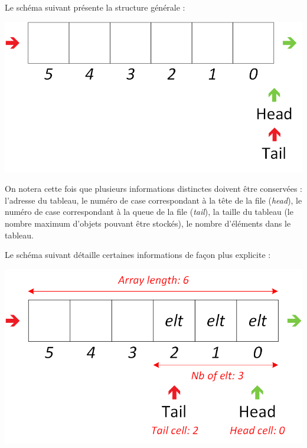 Le schéma suivant présente la structure générale :\\

\begin{center}
\includegraphics[scale=1]{Cours/Files_5_Tableau_Statique_Structure.png}
\end{center}

\smallskip

On notera cette fois que plusieurs informations distinctes doivent être conservées : l'adresse du tableau, le numéro de case correspondant à la tête de la file (\textit{head}), le numéro de case correspondant à la queue de la file (\textit{tail}), la taille du tableau (le nombre maximum d'objets pouvant être stockés), le nombre d'éléments dans le tableau.

Le schéma suivant détaille certaines informations de façon plus explicite :\\

\begin{center}
\includegraphics[scale=1]{Cours/Files_5_Tableau_Statique_Structure_Detaillee_1.png}
\end{center}

\smallskip

